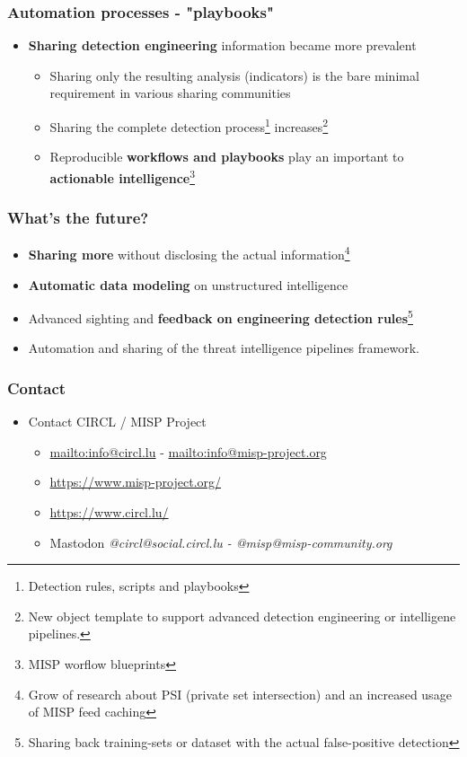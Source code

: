 \begin{frame}
  \frametitle{Automation processes - "playbooks"}
  \begin{itemize}
      \item {\bf Sharing detection engineering} information became more prevalent
              \begin{itemize}
                    \item Sharing only the resulting analysis (indicators) is the bare minimal requirement in various sharing communities
                    \item Sharing the complete detection process\footnote{Detection rules, scripts and playbooks} increases\footnote{New object template to support advanced detection engineering or intelligene pipelines.}
                    \item Reproducible {\bf workflows and playbooks} play an important to {\bf actionable intelligence}\footnote{MISP worflow blueprints} 
              \end{itemize}
  \end{itemize}
\end{frame}

\begin{frame}
  \frametitle{What's the future?}
  \begin{itemize}
      \item {\bf Sharing more} without disclosing the actual information\footnote{Grow of research about PSI (private set intersection) and an increased usage of MISP feed caching}
      \item {\bf Automatic data modeling} on unstructured intelligence 
      \item Advanced sighting and {\bf feedback on engineering detection rules}\footnote{Sharing back training-sets or dataset with the actual false-positive detection}
      \item Automation and sharing of the threat intelligence pipelines framework. 
  \end{itemize}
\end{frame}

\begin{frame}
    \frametitle{Contact}
  \begin{itemize}
      \item Contact CIRCL / MISP Project
    \begin{itemize}
        \item \url{mailto:info@circl.lu} - \url{mailto:info@misp-project.org}
      \item \url{https://www.misp-project.org/}
      \item \url{https://www.circl.lu/}
      \item Mastodon {\it @circl@social.circl.lu - @misp@misp-community.org}
    \end{itemize}
  \end{itemize}
\end{frame}
